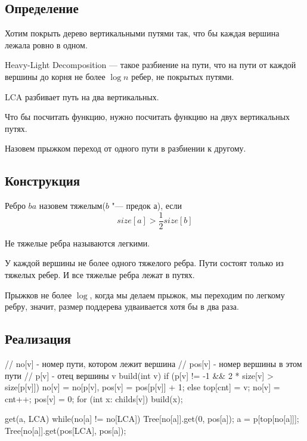 \subsection{Определение}

Хотим покрыть дерево вертикальными путями так, что бы каждая вершина лежала ровно в одном.
\begin{Def}
Heavy-Light Decomposition --- такое разбиение на пути, что на пути от каждой 
вершины до корня не более $\log n$ ребер, не покрытых путями.
\end{Def}


LCA разбивает путь на два вертикальных.

Что бы посчитать функцию, нужно посчитать функцию на двух вертикальных путях.


\begin{Def}
	Назовем прыжком переход от одного пути в разбиении к другому.
\end{Def}

\subsection{Конструкция}
\begin{Def}
	Ребро $ba$ назовем тяжелым($b$ "--- предок $а$), если
	\[ size[a] > \frac{1}{2}size[b] \]
\end{Def}
\begin{Def}
	Не тяжелые ребра называются легкими.
\end{Def}

У каждой вершины не более одного тяжелого ребра.
Пути состоят только из тяжелых ребер.
И все тяжелые ребра лежат в путях.

Прыжков не более $\log$, когда мы делаем прыжок, мы переходим по легкому ребру, значит, размер поддерева удваивается хотя бы в два раза.

\subsection{Реализация}

\begin{cppcode}
// no[v] - номер пути, котором лежит вершина
// pos[v] - номер вершины в этом пути
// p[v] - отец вершины v
build(int v) {
	if (p[v] != -1 && 2 * size[v] > size[p[v]]) {
		no[v] = no[p[v], pos[v] = pos[p[v]] + 1;
	} else {
		top[cnt] = v;
		no[v] = cnt++;
		pos[v] = 0;
	}
	for (int x: childs[v])
		build(x);
}

get(a, LCA) {
	while(no[a] != no[LCA]) {
		Tree[no[a]].get(0, pos[a]);
		a = p[top[no[a]]];
	}
	Tree[no[a]].get(pos[LCA], pos[a]);
}
\end{cppcode}

